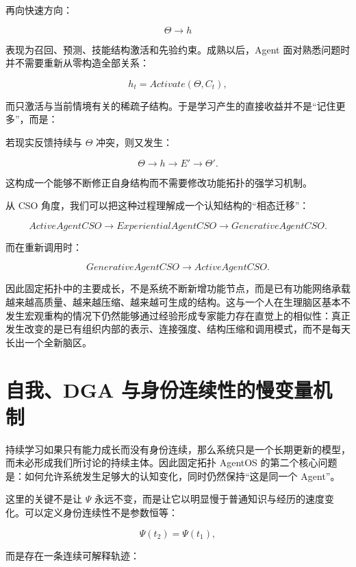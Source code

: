 再向快速方向：

\[
\Theta\rightarrow h
\]

表现为召回、预测、技能结构激活和先验约束。成熟以后，Agent 面对熟悉问题时并不需要重新从零构造全部关系：

\[
h_t
=
Activate(\Theta,C_t),
\]

而只激活与当前情境有关的稀疏子结构。于是学习产生的直接收益并不是“记住更多”，而是：

\begin{statementbox}
\centering
{}
\end{statementbox}

若现实反馈持续与 $\Theta$ 冲突，则又发生：

\[
\Theta\rightarrow h\rightarrow E'\rightarrow\Theta'.
\]

这构成一个能够不断修正自身结构而不需要修改功能拓扑的强学习机制。

从 CSO 角度，我们可以把这种过程理解成一个认知结构的“相态迁移”：

\[
ActiveAgentCSO
\rightarrow
ExperientialAgentCSO
\rightarrow
GenerativeAgentCSO.
\]

而在重新调用时：

\[
GenerativeAgentCSO
\rightarrow
ActiveAgentCSO.
\]

因此固定拓扑中的主要成长，不是系统不断新增功能节点，而是已有功能网络承载越来越高质量、越来越压缩、越来越可生成的结构。这与一个人在生理脑区基本不发生宏观重构的情况下仍然能够通过经验形成专家能力存在直觉上的相似性：真正发生改变的是已有组织内部的表示、连接强度、结构压缩和调用模式，而不是每天长出一个全新脑区。

\section{自我、DGA 与身份连续性的慢变量机制}

持续学习如果只有能力成长而没有身份连续，那么系统只是一个长期更新的模型，而未必形成我们所讨论的持续主体。因此固定拓扑 AgentOS 的第二个核心问题是：如何允许系统发生足够大的认知变化，同时仍然保持“这是同一个 Agent”。

这里的关键不是让 $\Psi$ 永远不变，而是让它以明显慢于普通知识与经历的速度变化。可以定义身份连续性不是参数恒等：

\[
\Psi(t_2)=\Psi(t_1),
\]

而是存在一条连续可解释轨迹：

